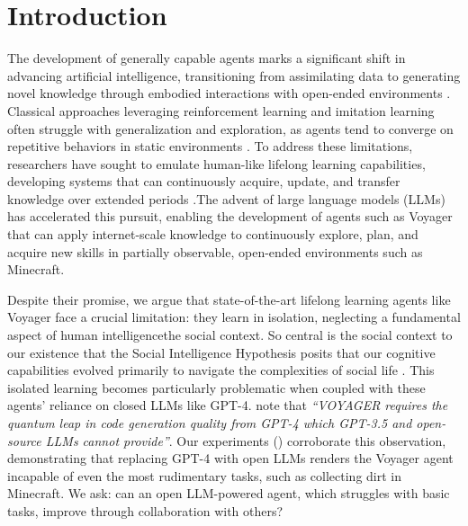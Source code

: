 \documentclass{article}
\begin{document}
\section{Introduction}\label{sec:intro}
The development of generally capable agents marks a significant shift in advancing artificial intelligence, transitioning from assimilating data to generating novel knowledge through embodied interactions with open-ended environments \citep{kolve2017ai2, savva2019habitat, puig2018virtualhome, shridhar2020alfred}. Classical approaches leveraging reinforcement learning \citep{schulman2017proximal, hafner2023mastering} and imitation learning \citep{zare2024survey} often struggle with generalization and exploration, as agents tend to converge on repetitive behaviors in static environments \citep{cobbe2019quantifying}. To address these limitations, researchers have sought to emulate human-like lifelong learning capabilities, developing systems that can continuously acquire, update, and transfer knowledge over extended periods \citep{parisi2019continual, wang2023comprehensive}.The advent of large language models (LLMs) has accelerated this pursuit, enabling the development of agents such as Voyager \citep{wang2023voyager} that can apply internet-scale knowledge to continuously explore, plan, and acquire new skills in partially observable, open-ended environments such as Minecraft. 

Despite their promise, we argue that state-of-the-art lifelong learning agents like Voyager face a crucial limitation: they learn in isolation, neglecting a fundamental aspect of human intelligence\textemdash the social context.  So central is the social context to our existence that the Social Intelligence Hypothesis posits that our cognitive capabilities evolved primarily to navigate the complexities of social life \citep{humphrey1976social, dunbar1998social}. This isolated learning becomes particularly problematic when coupled with these agents' reliance on closed LLMs like GPT-4. \citet{wang2023voyager} note that \textit{``VOYAGER requires the quantum leap in code generation quality from GPT-4 which GPT-3.5 and open-source LLMs cannot provide''}. Our experiments () corroborate this observation, demonstrating that replacing GPT-4 with open LLMs renders the Voyager agent incapable of even the most rudimentary tasks, such as collecting dirt in Minecraft. We ask: can an open LLM-powered agent, which struggles with basic tasks, improve through collaboration with others?
\end{document}
